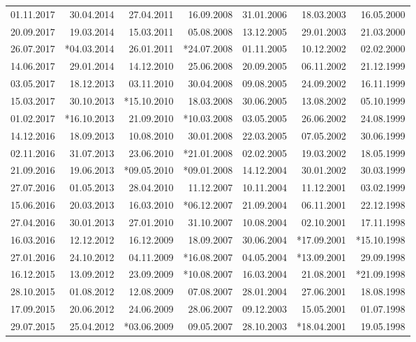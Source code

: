 \documentclass[11pt,a4paper,english,oneside]{book}
\numberwithin{equation}{chapter}
\begin{document}
\begin{table}[h]
\begin{tabular}{r r r r r r r }
						01.11.2017 & 30.04.2014 & 27.04.2011 & 16.09.2008 & 31.01.2006 & 18.03.2003 & 16.05.2000 \\
						20.09.2017 & 19.03.2014 & 15.03.2011 & 05.08.2008 & 13.12.2005 & 29.01.2003 & 21.03.2000 \\
						26.07.2017 & *04.03.2014 & 26.01.2011 & *24.07.2008 & 01.11.2005 & 10.12.2002 & 02.02.2000 \\
						14.06.2017 & 29.01.2014 & 14.12.2010 & 25.06.2008 & 20.09.2005 & 06.11.2002 & 21.12.1999 \\
						03.05.2017 & 18.12.2013 & 03.11.2010 & 30.04.2008 & 09.08.2005 & 24.09.2002 & 16.11.1999 \\
						15.03.2017 & 30.10.2013 & *15.10.2010 & 18.03.2008 & 30.06.2005 & 13.08.2002 & 05.10.1999 \\
						01.02.2017 & *16.10.2013 & 21.09.2010 & *10.03.2008 & 03.05.2005 & 26.06.2002 & 24.08.1999 \\
						14.12.2016 & 18.09.2013 & 10.08.2010 & 30.01.2008 & 22.03.2005 & 07.05.2002 & 30.06.1999 \\
						02.11.2016 & 31.07.2013 & 23.06.2010 & *21.01.2008 & 02.02.2005 & 19.03.2002 & 18.05.1999 \\
						21.09.2016 & 19.06.2013 & *09.05.2010 & *09.01.2008 & 14.12.2004 & 30.01.2002 & 30.03.1999 \\
						27.07.2016 & 01.05.2013 & 28.04.2010 & 11.12.2007 & 10.11.2004 & 11.12.2001 & 03.02.1999 \\
						15.06.2016 & 20.03.2013 & 16.03.2010 & *06.12.2007 & 21.09.2004 & 06.11.2001 & 22.12.1998 \\
						27.04.2016 & 30.01.2013 & 27.01.2010 & 31.10.2007 & 10.08.2004 & 02.10.2001 & 17.11.1998 \\
						16.03.2016 & 12.12.2012 & 16.12.2009 & 18.09.2007 & 30.06.2004 & *17.09.2001 & *15.10.1998 \\
						27.01.2016 & 24.10.2012 & 04.11.2009 & *16.08.2007 & 04.05.2004 & *13.09.2001 & 29.09.1998 \\
						16.12.2015 & 13.09.2012 & 23.09.2009 & *10.08.2007 & 16.03.2004 & 21.08.2001 & *21.09.1998 \\
						28.10.2015 & 01.08.2012 & 12.08.2009 & 07.08.2007 & 28.01.2004 & 27.06.2001 & 18.08.1998 \\
						17.09.2015 & 20.06.2012 & 24.06.2009 & 28.06.2007 & 09.12.2003 & 15.05.2001 & 01.07.1998 \\
						29.07.2015 & 25.04.2012 & *03.06.2009 & 09.05.2007 & 28.10.2003 & *18.04.2001 & 19.05.1998 \\

\end{tabular}
\end{table}
\end{document}
